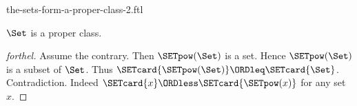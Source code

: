 \documentclass{naproche-library}
\begin{document}
\begin{smodule}[title=The Sets Form a Proper Class -- Cantor's Second Paradox]{the-sets-form-a-proper-class-2.ftl}

\begin{theorem}[forthel,title=Cantor's Second Paradox,id=cantor_paradox_2]
  $\Set$ is a proper class.
\end{theorem}
\begin{proof}[forthel]
  Assume the contrary.
  Then $\SETpow(\Set)$ is a set.
  Hence $\SETpow(\Set)$ is a subset of $\Set$.
  Thus $\SETcard{\SETpow(\Set)} \ORDleq \SETcard{\Set}$.
  Contradiction.
  Indeed $\SETcard{x} \ORDless \SETcard{\SETpow(x)}$ for any set $x$.
\end{proof}
\end{smodule}
\end{document}
